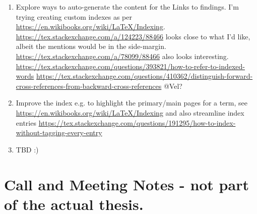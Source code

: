 \begin{enumerate}
    \item Explore ways to auto-generate the content for the Links to findings. I'm trying creating custom indexes as per \url{https://en.wikibooks.org/wiki/LaTeX/Indexing}. \url{https://tex.stackexchange.com/a/124223/88466} looks close to what I'd like, albeit the mentions would be in the side-margin. \url{https://tex.stackexchange.com/a/78099/88466} also looks interesting. \url{https://tex.stackexchange.com/questions/393821/how-to-refer-to-indexed-words} \url{https://tex.stackexchange.com/questions/410362/distinguish-forward-cross-references-from-backward-cross-references} @Vel?
    
    \item Improve the index e.g. to highlight the primary/main pages for a term, see \url{https://en.wikibooks.org/wiki/LaTeX/Indexing} and also streamline index entries \url{https://tex.stackexchange.com/questions/191295/how-to-index-without-tagging-every-entry}
    
    \item TBD :)

\end{enumerate}

\clearpage
\section{Call and Meeting Notes - not part of the actual thesis.}

